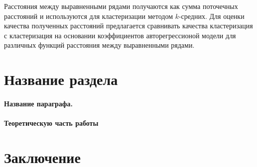 \documentclass[12pt,twoside]{article}
\begin{document}
        Расстояния между выравненными рядами получаются как сумма поточечных расстояний и используются для кластеризации методом $k$\--средних.
        Для оценки качества полученных расстояний предлагается сравнивать качества кластеризация с кластеризация на основании коэффициентов авторегрессионой модели для различных функций расстояния между выравненными рядами.
        

    \section{Название раздела}
    \paragraph{Название параграфа.}
    \paragraph{Теоретическую часть работы}
    \section{Заключение}

     
    
    
    
\end{document}

